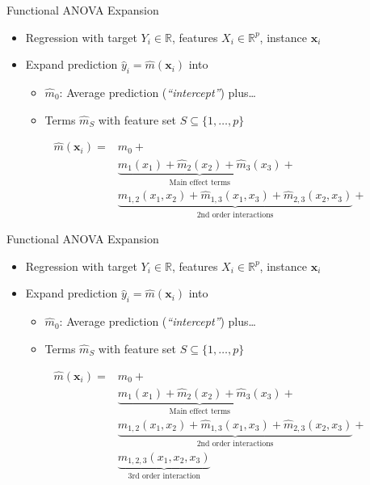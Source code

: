 \documentclass[aspectratio=169,12pt]{beamer}
\providecommand{\tightlist}{%
  \setlength{\itemsep}{2pt}\setlength{\parskip}{0pt}}
\begin{document}
\begin{frame}{Functional ANOVA Expansion}
\label{functional-anova-expansion-1}
\begin{itemize}
\tightlist
\item
  Regression with target \(Y_i \in \mathbb{R}\), features
  \(X_i \in \mathbb{R}^p\), instance \(\mathbf{x}_i\)
\item
  Expand prediction \(\hat{y}_i = \hat{m}(\mathbf{x}_i)\) into

  \begin{itemize}
  \tightlist
  \item
    \(\hat{m}_{0}\): Average prediction (\emph{``intercept''})
    plus\ldots{}
  \item
    Terms \(\hat{m}_S\) with feature set
    \(S \subseteq \{1, \ldots, p\}\)
  \end{itemize}
\end{itemize}

\begin{align*}
\hat{m}(\mathbf{x}_i) = & \hat{m}_{0} + \\
&  \underbrace{\hat{m}_1(x_1) + \hat{m}_2(x_2) + \hat{m}_3(x_3)}_{\text{Main effect terms}} + \\
&  \underbrace{\hat{m}_{1,2}(x_1,x_2) + \hat{m}_{1,3}(x_1,x_3) + \hat{m}_{2,3}(x_2,x_3)}_{\text{2nd order interactions}} +
\end{align*}

\vfill
\end{frame}

\begin{frame}{Functional ANOVA Expansion}
\label{functional-anova-expansion-2}
\begin{itemize}
\tightlist
\item
  Regression with target \(Y_i \in \mathbb{R}\), features
  \(X_i \in \mathbb{R}^p\), instance \(\mathbf{x}_i\)
\item
  Expand prediction \(\hat{y}_i = \hat{m}(\mathbf{x}_i)\) into

  \begin{itemize}
  \tightlist
  \item
    \(\hat{m}_{0}\): Average prediction (\emph{``intercept''})
    plus\ldots{}
  \item
    Terms \(\hat{m}_S\) with feature set
    \(S \subseteq \{1, \ldots, p\}\)
  \end{itemize}
\end{itemize}

\begin{align*}
\hat{m}(\mathbf{x}_i) = & \hat{m}_{0} + \\
&  \underbrace{\hat{m}_1(x_1) + \hat{m}_2(x_2) + \hat{m}_3(x_3)}_{\text{Main effect terms}} + \\
&  \underbrace{\hat{m}_{1,2}(x_1,x_2) + \hat{m}_{1,3}(x_1,x_3) + \hat{m}_{2,3}(x_2,x_3)}_{\text{2nd order interactions}} + \\ 
&  \underbrace{\hat{m}_{1,2,3}(x_1,x_2,x_3)}_{\text{3rd order interaction}}
\end{align*}

\vfill
\end{frame}
\end{document}
